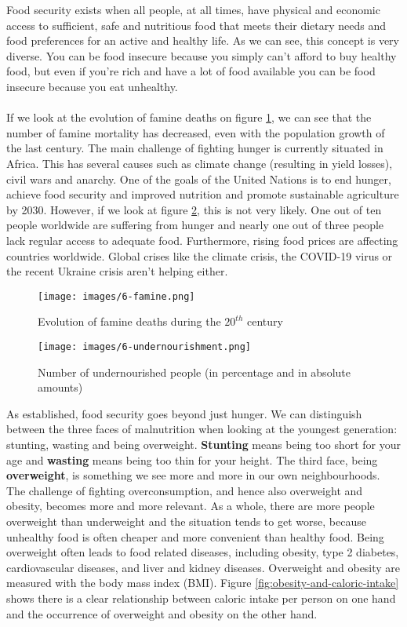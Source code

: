 \documentclass[../summary.tex]{subfiles}
\begin{document}
	Food security exists when all people, at all times, have physical and economic access to sufficient, safe and nutritious food that meets their dietary needs and food preferences for an active and healthy life. As we can see, this concept is very diverse. You can be food insecure because you simply can't afford to buy healthy food, but even if you're rich and have a lot of food available you can be food insecure because you eat unhealthy. 
	\\\\
	If we look at the evolution of famine deaths on figure \ref{fig:famine}, we can see that the number of famine mortality has decreased, even with the population growth of the last century. The main challenge of fighting hunger is currently situated in Africa. This has several causes such as climate change (resulting in yield losses), civil wars and anarchy. One of the goals of the United Nations is to end hunger, achieve food security and improved nutrition and promote sustainable agriculture by 2030. However, if we look at figure \ref{fig:undernourishment}, this is not very likely. One out of ten people worldwide are suffering from hunger and nearly one out of three people lack regular access to adequate food. Furthermore, rising food prices are affecting countries worldwide. Global crises like the climate crisis, the COVID-19 virus or the recent Ukraine crisis aren't helping either.
	
	\begin{figure}[htbp]
		\centering
		\texttt{[image: images/6-famine.png]}
		\caption{Evolution of famine deaths during the $20^{th}$ century}
		\label{fig:famine}
	\end{figure}
	
	\begin{figure}[htbp]
		\centering
		\texttt{[image: images/6-undernourishment.png]}
		\caption{Number of undernourished people (in percentage and in absolute amounts)}
		\label{fig:undernourishment}
	\end{figure}
	
	As established, food security goes beyond just hunger. We can distinguish between the three faces of malnutrition when looking at the youngest generation: stunting, wasting and being overweight.
	\textbf{Stunting} means being too short for your age and \textbf{wasting} means being too thin for your height. The third face, being \textbf{overweight}, is something we see more and more in our own neighbourhoods. The challenge of fighting overconsumption, and hence also overweight and obesity, becomes more and more relevant. As a whole, there are more people overweight than underweight and the situation tends to get worse, because unhealthy food is often cheaper and more convenient than healthy food. Being overweight often leads to food related diseases, including obesity, type 2 diabetes, cardiovascular diseases, and liver and kidney diseases. Overweight and obesity are measured with the body mass index (BMI). Figure \ref{fig:obesity-and-caloric-intake} shows there is a clear relationship between caloric intake per person on one hand and the occurrence of overweight and obesity on the other hand.
	
\end{document}
